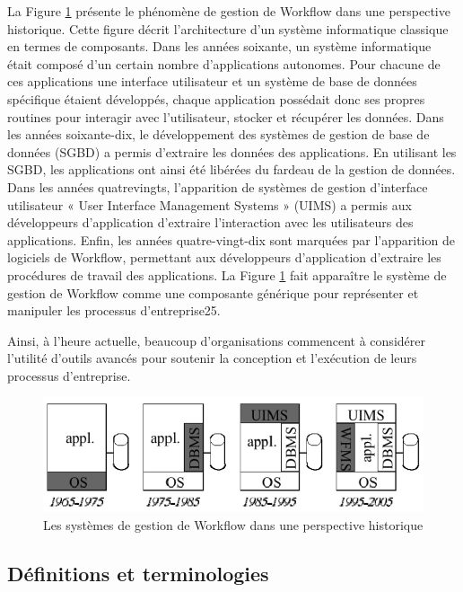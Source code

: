  	  La Figure \ref{fig:wfmchistory} présente le phénomène de gestion de Workflow dans une perspective historique. Cette figure décrit l’architecture d’un système informatique classique en termes de composants. Dans les années soixante, un système informatique était composé d’un certain nombre d’applications autonomes. Pour chacune de ces applications une interface utilisateur et un système de base de données spécifique étaient développés, chaque application possédait donc ses propres routines pour interagir avec l’utilisateur, stocker et récupérer les données. Dans les années soixante-dix, le développement des systèmes de gestion de base de données (SGBD) a permis d’extraire les données des applications. En utilisant les SGBD, les applications ont ainsi été libérées du fardeau de la gestion de données. Dans les années quatrevingts, l’apparition de systèmes de gestion d’interface utilisateur « User Interface Management Systems » (UIMS) a permis aux développeurs d’application d’extraire l’interaction avec les utilisateurs des applications. Enfin, les années quatre-vingt-dix sont marquées par l’apparition de logiciels de Workflow, permettant aux développeurs d’application d’extraire les procédures de travail des applications. La Figure \ref{fig:wfmchistory} fait apparaître le système de gestion de Workflow comme une composante générique pour représenter et manipuler les processus d’entreprise25. 
 	  
 	  Ainsi, à l’heure actuelle, beaucoup d’organisations commencent à considérer l’utilité d’outils avancés pour soutenir la conception et l’exécution de leurs processus d’entreprise.
 	 
 	 
 	 
\begin{figure}[h]
	\centering
	\includegraphics[width=0.7\linewidth]{images/wfmcHistory}
	\caption{Les systèmes de gestion de Workflow dans une perspective historique }
	\label{fig:wfmchistory}
\end{figure}
 	 
 	 
 	 \subsection{Définitions et terminologies }
 	 
